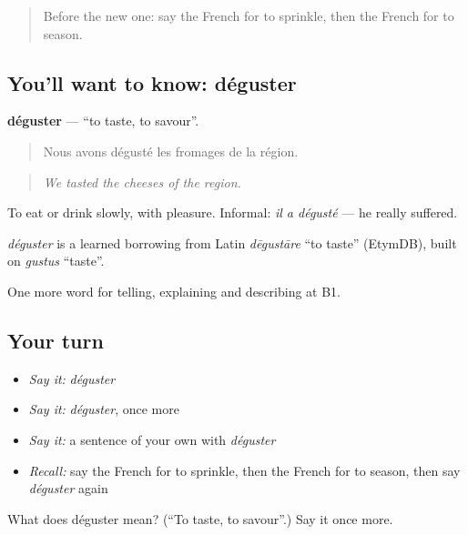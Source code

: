 \label{lesson:FR-C332-deguster}



\begin{quote}
Before the new one: say the French for to sprinkle, then the French for to season.
\end{quote}

\subsection*{You'll want to know: déguster}
\textbf{déguster} — \textquotedblleft{}to taste, to savour\textquotedblright{}.

\begin{quote}
Nous avons dégusté les fromages de la région.
\end{quote}

\begin{quote}
\emph{We tasted the cheeses of the region.}
\end{quote}

To eat or drink slowly, with pleasure. Informal: \emph{il a dégusté} — he really suffered.

\begin{cousinweb}
\emph{déguster} is a learned borrowing from Latin \emph{dēgustāre} \textquotedblleft{}to taste\textquotedblright{} (EtymDB), built on \emph{gustus} \textquotedblleft{}taste\textquotedblright{}.
\end{cousinweb}

\begin{grammarlens}[title={What you've built}]
One more word for telling, explaining and describing at B1.
\end{grammarlens}

\subsection*{Your turn}
\begin{itemize}
\raggedright
  \item \emph{Say it:} \emph{déguster}
  \item \emph{Say it:} \emph{déguster}, once more
  \item \emph{Say it:} a sentence of your own with \emph{déguster}
  \item \emph{Recall:} say the French for to sprinkle, then the French for to season, then say \emph{déguster} again
\end{itemize}

\begin{tcolorbox}[breakable,colback=teal!4,colframe=teal!35!black,title={Before you move on}]
What does déguster mean? (\textquotedblleft{}To taste, to savour\textquotedblright{}.) Say it once more.
\end{tcolorbox}

